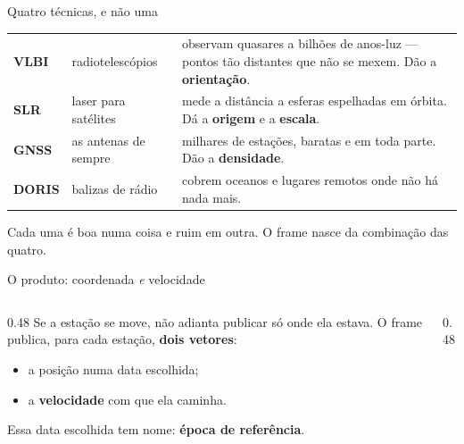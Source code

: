 \documentclass[aspectratio=169,11pt]{beamer}
\newcommand{\bnum}[1]{\textbf{\textcolor{mTeal}{#1}}}
\begin{document}
\begin{frame}{Quatro técnicas, e não uma}
  \centering
  \small
  \renewcommand{\arraystretch}{1.35}
  \begin{tabular}{llp{6.2cm}}
    \toprule
    \textbf{VLBI} & radiotelescópios & observam quasares a bilhões de anos-luz --- pontos
      tão distantes que não se mexem. Dão a \bnum{orientação}. \\
    \textbf{SLR} & laser para satélites & mede a distância a esferas espelhadas em órbita.
      Dá a \bnum{origem} e a \bnum{escala}. \\
    \textbf{GNSS} & as antenas de sempre & milhares de estações, baratas e em toda parte.
      Dão a \bnum{densidade}. \\
    \textbf{DORIS} & balizas de rádio & cobrem oceanos e lugares remotos onde não há nada
      mais. \\
    \bottomrule
  \end{tabular}
  \bigskip

  Cada uma é boa numa coisa e ruim em outra. O frame nasce da \alert{combinação} das
  quatro.
\end{frame}

\begin{frame}{O produto: coordenada \emph{e} velocidade}
  \begin{columns}[T]
    \begin{column}{0.48\textwidth}
      Se a estação se move, não adianta publicar só onde ela estava. O frame publica,
      para cada estação, \bnum{dois vetores}:
      \medskip
      \begin{itemize}
        \item a posição numa data escolhida;
        \item a \bnum{velocidade} com que ela caminha.
      \end{itemize}
      \medskip
      Essa data escolhida tem nome: \bnum{época de referência}.
    \end{column}
    \begin{column}{0.48\textwidth}
      \centering
    \end{column}
  \end{columns}
\end{frame}
\end{document}
